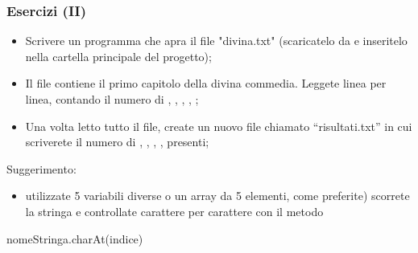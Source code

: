 \begin{frame}[fragile]\frametitle{Esercizi (II)}
  \begin{itemize}
   \item Scrivere un  programma che apra il file  "divina.txt" (scaricatelo da
   {\footnotesize {}} e inseritelo
   nella cartella principale del  progetto);
   \item Il file contiene il primo  capitolo della divina commedia.  Leggete linea per linea, contando
   il numero di ,  ,  ,  ,  ;
   \item Una volta letto tutto il file,  create  un  nuovo file  chiamato “risultati.txt” in  cui  scriverete il
   numero di ,  ,  ,  ,   presenti;
  \end{itemize}

  Suggerimento:
  \begin{itemize}
   \item utilizzate 5  variabili diverse  o  un  array  da  5  elementi,  come  preferite)
  scorrete la  stringa e controllate carattere per  carattere con il metodo
  \end{itemize}

  \begin{center}
  \begin{minipage}[c]{5cm}
  \begin{JavaCodePlain}[commandchars=\\!|]
  nomeStringa.charAt(indice)
  \end{JavaCodePlain}
  \end{minipage}
  \end{center}
  
\end{frame}

